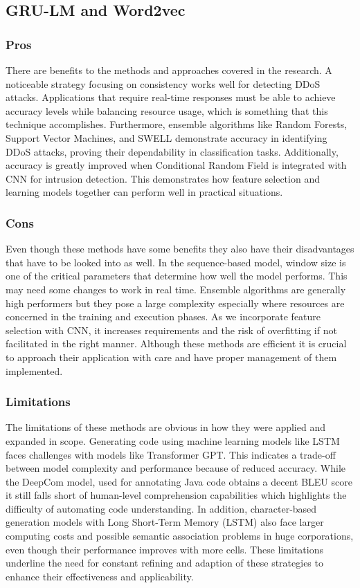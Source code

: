 \documentclass[a4paper, 12pt]{article}
\begin{document}
\subsection{GRU-LM and Word2vec}
\subsubsection{Pros}
There are benefits to the methods and approaches covered in the research. A noticeable strategy focusing on consistency works well for detecting DDoS attacks. Applications that require real-time responses must be able to achieve accuracy levels while balancing resource usage, which is something that this technique accomplishes. Furthermore, ensemble algorithms like Random Forests, Support Vector Machines, and SWELL demonstrate accuracy in identifying DDoS attacks, proving their dependability in classification tasks. Additionally, accuracy is greatly improved when Conditional Random Field is integrated with CNN for intrusion detection. This demonstrates how feature selection and learning models together can perform well in practical situations.
\subsubsection{Cons}
Even though these methods have some benefits they also have their disadvantages that have to be looked into as well. In the sequence-based model, window size is one of the critical parameters that determine how well the model performs. This may need some changes to work in real time. Ensemble algorithms are generally high performers but they pose a large complexity especially where resources are concerned in the training and execution phases. As we incorporate feature selection with CNN, it increases requirements and the risk of overfitting if not facilitated in the right manner. Although these methods are efficient it is crucial to approach their application with care and have proper management of them implemented.
\subsubsection{Limitations}
The limitations of these methods are obvious in how they were applied and expanded in scope. Generating code using machine learning models like LSTM faces challenges with models like Transformer GPT. This indicates a trade-off between model complexity and performance because of reduced accuracy. While the DeepCom model, used for annotating Java code obtains a decent BLEU score it still falls short of human-level comprehension capabilities which highlights the difficulty of automating code understanding. In addition, character-based generation models with Long Short-Term Memory (LSTM) also face larger computing costs and possible semantic association problems in huge corporations, even though their performance improves with more cells. These limitations underline the need for constant refining and adaption of these strategies to enhance their effectiveness and applicability.
\end{document}
